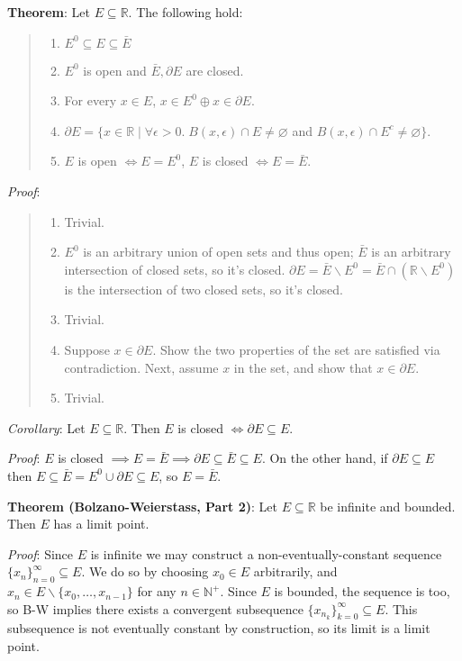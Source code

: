 \documentclass[11pt]{article}
\begin{document}
\textbf{Theorem}: Let $E \subseteq \mathbb{R}$. The following hold:
\begin{quote}\vspace{-0.3cm}
	\begin{enumerate}
	\item $E^0 \subseteq E \subseteq \bar{E}$
	\item $E^0$ is open and $\bar{E}, \partial E$ are closed.
	\item For every $x \in E$, $x \in E^0 \oplus x \in \partial E$.
	\item $\partial E = \{x \in \mathbb{R} \mid \forall \epsilon > 0.\; B(x, \epsilon) \cap E \neq \varnothing$ and $B(x, \epsilon) \cap E^c \neq \varnothing\}$.
	\item $E$ is open $\iff E = E^0$, $E$ is closed $\iff E = \bar{E}$.
	\end{enumerate}
\end{quote}
\emph{Proof}:
\begin{quote}\vspace{-0.3cm}
	\begin{enumerate}
	\item Trivial.
	\item $E^0$ is an arbitrary union of open sets and thus open; $\bar{E}$ is an arbitrary intersection of closed sets, so it's closed. $\partial E = \bar{E} \backslash E^0 = \bar{E} \cap (\mathbb{R} \backslash E^0)$ is the intersection of two closed sets, so it's closed.
	\item Trivial.
	\item Suppose $x \in \partial E$. Show the two properties of the set are satisfied via contradiction. Next, assume $x$ in the set, and show that $x \in \partial E$.
	\item Trivial.
	\end{enumerate}
\end{quote}

\emph{Corollary}: Let $E \subseteq \mathbb{R}$. Then $E$ is closed $\iff \partial E \subseteq E$.

\emph{Proof}: $E$ is closed $\implies E = \bar{E} \implies \partial E \subseteq \bar{E} \subseteq E$. On the other hand, if $\partial E \subseteq E$ then $E \subseteq \bar{E} = E^0 \cup \partial E \subseteq E$, so $E = \bar{E}$.

\textbf{Theorem (Bolzano-Weierstass, Part 2)}: Let $E \subseteq \mathbb{R}$ be infinite and bounded. Then $E$ has a limit point.

\emph{Proof}: Since $E$ is infinite we may construct a non-eventually-constant sequence $\{x_n\}_{n=0}^\infty \subseteq E$. We do so by choosing $x_0 \in E$ arbitrarily, and $x_n \in E \backslash \{x_0, \ldots, x_{n-1}\}$ for any $n \in \mathbb{N}^+$. Since $E$ is bounded, the sequence is too, so B-W implies there exists a convergent subsequence $\{x_{n_k}\}_{k=0}^\infty \subseteq E$. This subsequence is not eventually constant by construction, so its limit is a limit point.
\end{document}
